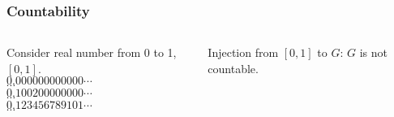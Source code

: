\documentclass{beamer}
\begin{document}
\begin{frame}
\frametitle{Countability}
\begin{columns}
Consider real number from 0 to 1, $[0,1]$.\\
$0.000000000000 \cdots$\\
$\cdots$\\
$0.100200000000 \cdots $\\ 
$\cdots$\\
$0.123456789101 \cdots$\\
$\cdots$\\


Injection from $[0,1]$ to $G$: $G$ is not countable.

\end{columns}
\end{frame}

%
%
%
\end{document}
